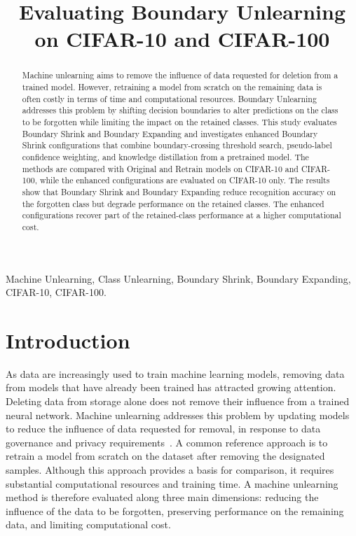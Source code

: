 \documentclass[conference]{IEEEtran}
\begin{document}
\title{Evaluating Boundary Unlearning on CIFAR-10 and CIFAR-100}
\author{
}
\maketitle
\begin{abstract}
Machine unlearning aims to remove the influence of data requested for deletion from a trained model. However, retraining a model from scratch on the remaining data is often costly in terms of time and computational resources. Boundary Unlearning addresses this problem by shifting decision boundaries to alter predictions on the class to be forgotten while limiting the impact on the retained classes. This study evaluates Boundary Shrink and Boundary Expanding and investigates enhanced Boundary Shrink configurations that combine boundary-crossing threshold search, pseudo-label confidence weighting, and knowledge distillation from a pretrained model. The methods are compared with Original and Retrain models on CIFAR-10 and CIFAR-100, while the enhanced configurations are evaluated on CIFAR-10 only. The results show that Boundary Shrink and Boundary Expanding reduce recognition accuracy on the forgotten class but degrade performance on the retained classes. The enhanced configurations recover part of the retained-class performance at a higher computational cost.
\end{abstract}
\begin{IEEEkeywords}
Machine Unlearning, Class Unlearning, Boundary Shrink, Boundary Expanding, CIFAR-10, CIFAR-100.
\end{IEEEkeywords}

\section{Introduction}
As data are increasingly used to train machine learning models, removing data from models that have already been trained has attracted growing attention. Deleting data from storage alone does not remove their influence from a trained neural network. Machine unlearning addresses this problem by updating models to reduce the influence of data requested for removal, in response to data governance and privacy requirements~\cite{bourtoule2021machine}. A common reference approach is to retrain a model from scratch on the dataset after removing the designated samples. Although this approach provides a basis for comparison, it requires substantial computational resources and training time. A machine unlearning method is therefore evaluated along three main dimensions: reducing the influence of the data to be forgotten, preserving performance on the remaining data, and limiting computational cost.
\end{document}
